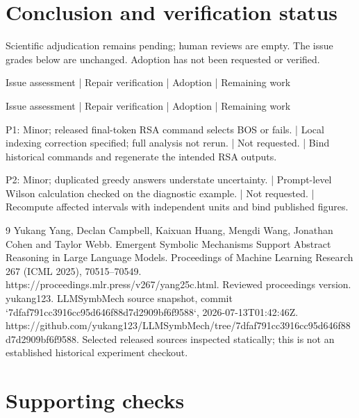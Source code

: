 \documentclass[10pt]{article}
\begin{document}
\section*{Conclusion and verification status}
Scientific adjudication remains pending; human reviews are empty. The issue grades below are unchanged. Adoption has not been requested or verified.\par
Issue assessment | Repair verification | Adoption | Remaining work\par
Issue assessment | Repair verification | Adoption | Remaining work\par
P1: Minor; released final-token RSA command selects BOS or fails. | Local indexing correction specified; full analysis not rerun. | Not requested. | Bind historical commands and regenerate the intended RSA outputs.\par
P2: Minor; duplicated greedy answers understate uncertainty. | Prompt-level Wilson calculation checked on the diagnostic example. | Not requested. | Recompute affected intervals with independent units and bind published figures.\par
9 Yukang Yang, Declan Campbell, Kaixuan Huang, Mengdi Wang, Jonathan Cohen and Taylor Webb. Emergent Symbolic Mechanisms Support Abstract Reasoning in Large Language Models. Proceedings of Machine Learning Research 267 (ICML 2025), 70515–70549. https://proceedings.mlr.press/v267/yang25c.html. Reviewed proceedings version. yukang123. LLMSymbMech source snapshot, commit `7dfaf791cc3916cc95d646f88d7d2909bf6f9588`, 2026-07-13T01:42:46Z. https://github.com/yukang123/LLMSymbMech/tree/7dfaf791cc3916cc95d646f88d7d2909bf6f9588. Selected released sources inspected statically; this is not an established historical experiment checkout.\par
\section*{Supporting checks}
\end{document}
